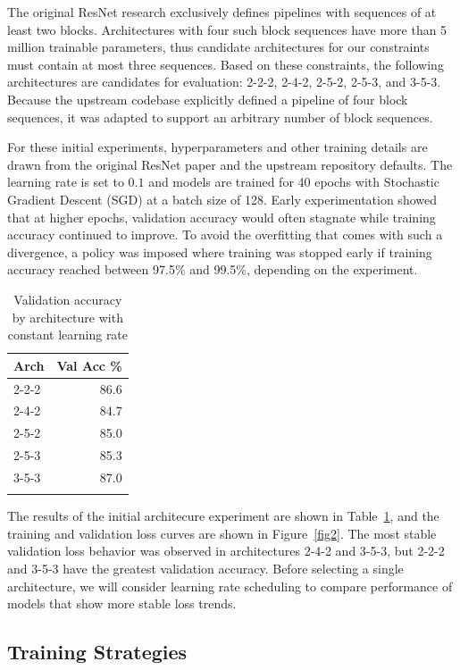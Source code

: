 \documentclass[letterpaper]{article} %
\begin{document}
The original ResNet research exclusively defines pipelines with sequences of at least two blocks.
Architectures with four such block sequences have more than 5 million trainable parameters, thus candidate
architectures for our constraints must contain at most three sequences.
Based on these constraints, the following architectures are candidates for evaluation:
2-2-2, 2-4-2, 2-5-2, 2-5-3, and 3-5-3.
Because the upstream codebase explicitly defined a pipeline of four block sequences, it was adapted to support an
arbitrary number of block sequences.

For these initial experiments, hyperparameters and other training details are drawn from the original ResNet paper and
the upstream repository defaults.
The learning rate is set to $ 0.1 $ and models are trained for 40 epochs with
Stochastic Gradient Descent (SGD) at a batch size of 128.
Early experimentation showed that at higher epochs, validation accuracy would often
stagnate while training accuracy continued to improve.
To avoid the overfitting that comes with such a divergence, a policy was imposed where
training was stopped early if training accuracy reached between 97.5\% and 99.5\%,
depending on the experiment.

\begin{table}[b]
\centering
\begin{tabular}{|l|r|}
    \firsthline
    Arch & Val Acc \%    \\
    \hline
    2-2-2 & 86.6    \\
    2-4-2 & 84.7    \\
    2-5-2 & 85.0    \\
    2-5-3 & 85.3    \\
    3-5-3 & 87.0    \\
    \lasthline
\end{tabular}
\caption{Validation accuracy by architecture with constant learning rate}
\label{table1}
\end{table}

The results of the initial architecure experiment are shown in Table~\ref{table1}, and
the training and validation loss curves are shown in Figure~\ref{fig2}.
The most stable validation loss behavior was observed in architectures 2-4-2 and 3-5-3, but 2-2-2 and 3-5-3
have the greatest validation accuracy.
Before selecting a single architecture, we will consider learning rate scheduling to compare performance
of models that show more stable loss trends.

\subsection{Training Strategies}
\end{document}

